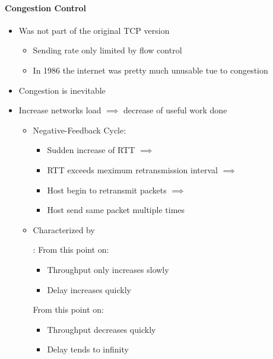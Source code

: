 \paragraph{Congestion Control}
\begin{itemize}
    \item Was not part of the original TCP version
        \begin{itemize}
            \item Sending rate only limited by flow control
            \item In 1986 the internet was pretty much unusable tue to congestion
        \end{itemize}
    \item Congestion is inevitable
    \item Increase networks load $\implies$ decrease of useful work done
        \begin{itemize}
            \item Negative-Feedback Cycle:
                \begin{itemize}
                    \item Sudden increase of RTT $\implies$
                    \item RTT exceeds meximum retransmission interval $\implies$
                    \item Host begin to retransmit packets $\implies$
                    \item Host send same packet multiple times
                \end{itemize}
            \item Characterized by
                \begin{itemize}
                    : From this point on:
                        \begin{itemize}
                            \item Throughput only increases slowly
                            \item Delay increases quickly
                        \end{itemize}
                     From this point on:
                        \begin{itemize}
                            \item Throughput decreases quickly
                            \item Delay tends to infinity
                        \end{itemize}

\end{itemize}
\end{itemize}
\end{itemize}
